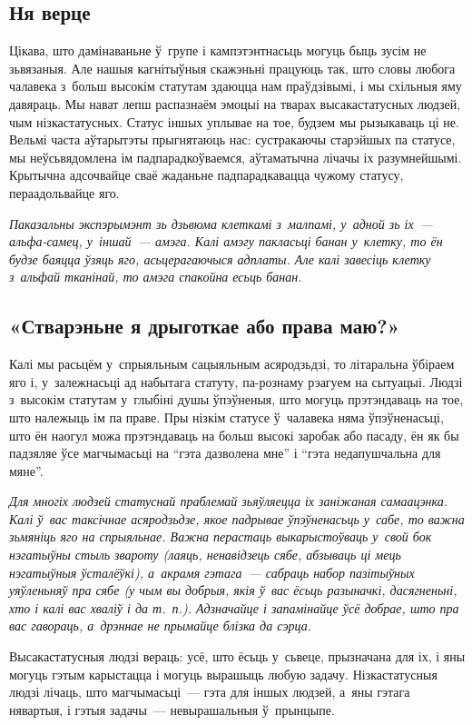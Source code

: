 \subsection*{Ня верце}

Цікава, што дамінаваньне ў~групе і кампэтэнтнасьць могуць быць зусім не зьвязаныя. Але нашыя кагнітыўныя скажэньні працуюць так, што словы любога чалавека з~больш высокім статутам здаюцца нам праўдзівымі, і мы схільныя яму давяраць. Мы нават лепш распазнаём эмоцыі на тварах высакастатусных людзей, чым нізкастатусных. Статус іншых уплывае на тое, будзем мы рызыкаваць ці не. Вельмі часта аўтарытэты прыгнятаюць нас: сустракаючы старэйшых па статусе, мы неўсьвядомлена ім падпарадкоўваемся, аўтаматычна лічачы іх разумнейшымі. Крытычна адсочвайце сваё жаданьне падпарадкавацца чужому статусу, пераадольвайце яго.

\emph{Паказальны экспэрымэнт зь дзьвюма клеткамі з~малпамі, у~адной зь іх~--- альфа-самец, у~іншай~--- амэга. Калі амэгу пакласьці банан у~клетку, то ён будзе баяцца ўзяць яго, асьцерагаючыся адплаты. Але калі завесіць клетку з~альфай тканінай, то амэга спакойна есьць банан.}

\subsection*{«Стварэньне я дрыготкае або права маю?»}

Калі мы расьцём у~спрыяльным сацыяльным асяродзьдзі, то літаральна ўбіраем яго і, у~залежнасьці ад набытага статуту, па-рознаму рэагуем на сытуацыі. Людзі з~высокім статутам у~глыбіні душы ўпэўненыя, што могуць прэтэндаваць на тое, што належыць ім па праве. Пры нізкім статусе ў~чалавека няма ўпэўненасьці, што ён наогул можа прэтэндаваць на больш высокі заробак або пасаду, ён як бы падзяляе ўсе магчымасьці на ``гэта дазволена мне'' і ``гэта недапушчальна для мяне''.

\emph{Для многіх людзей статуснай праблемай зьяўляецца іх заніжаная самаацэнка. Калі ў~вас таксічнае асяродзьдзе, якое падрывае ўпэўненасьць у~сабе, то важна зьмяніць яго на спрыяльнае. Важна перастаць выкарыстоўваць у~свой бок нэгатыўны стыль звароту (лаяць, ненавідзець сябе, абзываць ці мець нэгатыўныя ўсталёўкі), а~акрамя гэтага~--- сабраць набор пазітыўных уяўленьняў пра сябе (у чым вы добрыя, якія ў~вас ёсьць разыначкі, дасягненьні, хто і калі вас хваліў і да т.~п.). Адзначайце і запамінайце ўсё добрае, што пра вас гавораць, а~дрэннае не прымайце блізка да сэрца.}

Высакастатусныя людзі вераць: усё, што ёсьць у~сьвеце, прызначана для іх, і яны могуць гэтым карыстацца і могуць вырашыць любую задачу. Нізкастатусныя людзі лічаць, што магчымасьці~--- гэта для іншых людзей, а~яны гэтага нявартыя, і гэтыя задачы~--- невырашальныя ў~прынцыпе.

